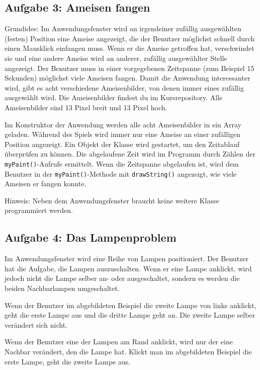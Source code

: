 \subsection{Aufgabe 3: Ameisen fangen}

Grundidee: Im Anwendungsfenster wird an irgendeiner zufällig ausgewählten
(festen) Position eine Ameise angezeigt, die der Benutzer möglichst schnell
durch einen Mausklick einfangen muss. Wenn er die Ameise getroffen hat,
verschwindet sie und eine andere Ameise wird an anderer, zufällig ausgewählter
Stelle angezeigt. Der Benutzer muss in einer vorgegebenen Zeitspanne (zum
Beispiel 15 Sekunden) möglichst viele Ameisen fangen. Damit die Anwendung
interessanter wird, gibt es acht verschiedene Ameisenbilder, von denen immer
eines zufällig ausgewählt wird. Die Ameisenbilder findest du im Kursrepository.
Alle Ameisenbilder sind 13 Pixel breit und 13 Pixel hoch.

Im Konstruktor der Anwendung werden alle acht Ameisenbilder in ein Array
geladen. Während des Spiels wird immer nur eine Ameise an einer zufälligen
Position angezeigt. Ein Objekt der Klasse  wird gestartet, um den
Zeitablauf überprüfen zu können. Die abgelaufene Zeit wird im Programm durch
Zählen der \lstinline|myPaint()|-Aufrufe ermittelt. Wenn die Zeitspanne
abgelaufen ist, wird dem Benutzer in der \lstinline|myPaint()|-Methode mit
\lstinline|drawString()| angezeigt, wie viele Ameisen er fangen konnte.

Hinweis: Neben dem Anwendungsfenster braucht keine weitere Klasse programmiert
werden.


\subsection{Aufgabe 4: Das Lampenproblem}

Im Anwendungsfenster wird eine Reihe von Lampen positioniert. Der Benutzer hat
die Aufgabe, die Lampen auszuschalten. Wenn er eine Lampe anklickt, wird jedoch
nicht die Lampe selber an- oder ausgeschaltet, sondern es werden die beiden
Nachbarlampen umgeschaltet.

Wenn der Benutzer im abgebildeten Beispiel die zweite Lampe von links anklickt,
geht die erste Lampe aus und die dritte Lampe geht an. Die zweite Lampe selber
verändert sich nicht.

Wenn der Benutzer eine der Lampen am Rand anklickt, wird nur der eine Nachbar
verändert, den die Lampe hat. Klickt man im abgebildeten Beispiel die erste
Lampe, geht die zweite Lampe aus.

